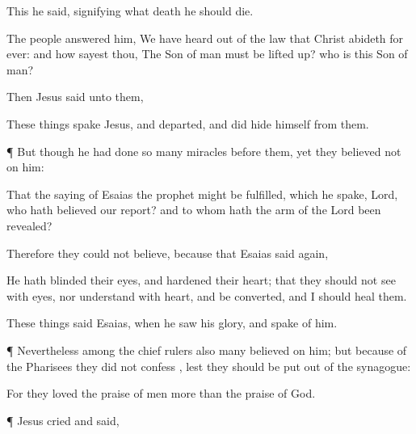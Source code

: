 {This he
said,
signifying
what
death he
should
die.

The
people
answered
him,
We have
heard
out of the
law
that
Christ
abideth
for
ever:
and
how
sayest
thou, The
Son of
man
must be lifted
up?
who
is
this
Son of
man?

Then
Jesus
said unto
them,
{}

 These
things
spake
Jesus,
and
departed, and did hide
himself
from
them.


\par }{\PP {}¶
But
though
he had
done so
many
miracles
before
them, yet they
believed
not
on
him:

That the
saying of
Esaias the
prophet might be
fulfilled,
which he
spake,
Lord,
who hath
believed
our
report?
and to
whom
hath the
arm of the
Lord been
revealed?

Therefore they
could
not
believe,
because
that
Esaias
said
again,

He hath
blinded
their
eyes,
and
hardened
their
heart;
that they
should
not
see
with
{}
eyes,
nor
understand
with
{}
heart,
and be
converted,
and I should
heal
them.

These
things
said
Esaias,
when he
saw
his
glory,
and
spake
of
him.


\par }{\PP {}¶
Nevertheless
among the chief
rulers
also
many
believed
on
him;
but
because of the
Pharisees they
did
not
confess
{},
lest they should
be put out of the
synagogue:

For they
loved the
praise of
men
more
than the
praise of
God.


\par }{\PP {}¶
Jesus
cried
and
said,
{}




}
